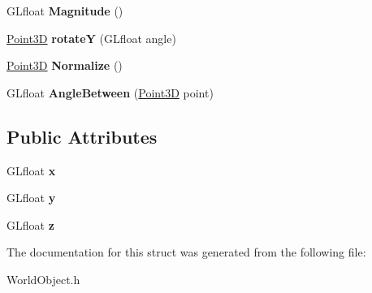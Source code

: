 \begin{DoxyCompactItemize}
\item 
\hypertarget{struct_point3_d_a39f927a68d58a323facabde9136e3319}{G\+Lfloat {\bfseries Magnitude} ()}\label{struct_point3_d_a39f927a68d58a323facabde9136e3319}

\item 
\hypertarget{struct_point3_d_ac9c0cb7390bde518217651587119ff87}{\hyperlink{struct_point3_d}{Point3\+D} {\bfseries rotate\+Y} (G\+Lfloat angle)}\label{struct_point3_d_ac9c0cb7390bde518217651587119ff87}

\item 
\hypertarget{struct_point3_d_a12bea3732255eceaad6bba3f3e7de179}{\hyperlink{struct_point3_d}{Point3\+D} {\bfseries Normalize} ()}\label{struct_point3_d_a12bea3732255eceaad6bba3f3e7de179}

\item 
\hypertarget{struct_point3_d_a15963489cfc76c387e031d92eb2ade2a}{G\+Lfloat {\bfseries Angle\+Between} (\hyperlink{struct_point3_d}{Point3\+D} point)}\label{struct_point3_d_a15963489cfc76c387e031d92eb2ade2a}

\end{DoxyCompactItemize}
\subsection*{Public Attributes}
\begin{DoxyCompactItemize}
\item 
\hypertarget{struct_point3_d_a5d428049115cb9b3ce0fbe5b7433e449}{G\+Lfloat {\bfseries x}}\label{struct_point3_d_a5d428049115cb9b3ce0fbe5b7433e449}

\item 
\hypertarget{struct_point3_d_a266c2ec796b3af5f5a232cad101ac278}{G\+Lfloat {\bfseries y}}\label{struct_point3_d_a266c2ec796b3af5f5a232cad101ac278}

\item 
\hypertarget{struct_point3_d_a8dc7ed16862ef24cb1d3e845b40d89f9}{G\+Lfloat {\bfseries z}}\label{struct_point3_d_a8dc7ed16862ef24cb1d3e845b40d89f9}

\end{DoxyCompactItemize}


The documentation for this struct was generated from the following file\+:\begin{DoxyCompactItemize}
\item 
World\+Object.\+h\end{DoxyCompactItemize}
